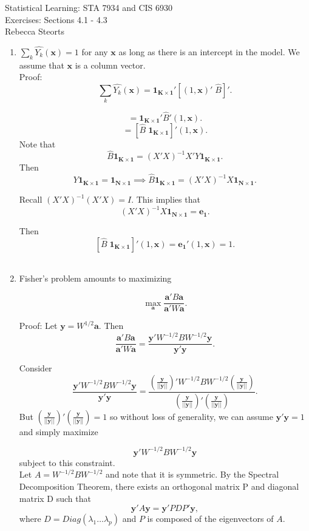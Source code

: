 \documentclass[12pt]{book}
\begin{document}
\newcommand{\ba} {\bm{a}}
\newcommand{\by} {\bm{y}}
\newcommand{\bx} {\bm{x}}
\newcommand{\bxn} {\bm{x_{new}}}
\newcommand{\bok} {\bm{1_{K\times 1}}}
\newcommand{\bon} {\bm{1_{N\times 1}}}
Statistical Learning: STA 7934 and CIS 6930\\
Exercises: Sections 4.1 - 4.3\\
Rebecca Steorts\\


\begin{enumerate}

\item $\sum_k \hat{Y_k}(\bx) = 1$ for any $\bx$ as long as there is an intercept in the model. We assume that $\bx$ is a column vector.\\

Proof: $$\sum_k \hat{Y_k}(\bx) =\bok' [(1,\bx)' \;\hat{B}]'.$$

$$ = \bok' \hat{B}' (1, \bx).$$
$$ = [\hat{B} \; \bok]' (1, \bx).$$
Note that $$\hat{B} \bok = (X'X)^{-1}X'Y\bok.$$
Then $$Y\bok = \bon \implies 
\hat{B} \bok = (X'X)^{-1}X \bon.$$

Recall $(X'X)^{-1}(X'X) = I.$ This implies that
$$ (X'X)^{-1}X \bon = \bm{e_1}.$$

Then $$ [\hat{B} \; \bok]' (1, \bx) = \bm{e_1}' (1, \bx) = 1.$$\\

\item Fisher's problem amounts to maximizing

$$ \max_{\ba}  \frac{\ba' B\ba }{\ba' W\ba }.$$



Proof: Let $\by = W^{1/2}\ba.$ Then
$$
\frac{\ba' B\ba }{\ba' W\ba } = 
\frac{\by' W^{-1/2}BW^{-1/2}\by}{\by' \by }.$$

Consider $$\frac{\by' W^{-1/2}BW^{-1/2}\by}{\by' \by } =
 \frac{\left(\frac{\by}{|| \by||}\right)'W^{-1/2}BW^{-1/2}\left(\frac{\by}{|| \by||}\right)}
{\left(\frac{\by}{|| \by||}\right)'\left(\frac{\by}{|| \by||}\right)}.$$ But $\left(\frac{\by}{|| \by||}\right)'\left(\frac{\by}{|| \by||}\right) = 1$ so without loss of generality, we can assume $\by'\by = 1$ and simply maximize 

$$\by' W^{-1/2}BW^{-1/2}\by$$ subject to this constraint.\\

Let $A = W^{-1/2}BW^{-1/2}$ and note that it is symmetric. By the Spectral Decomposition Theorem, there exists an orthogonal matrix P and diagonal matrix D such that
$$ \by' A \by = \by' PDP' \by,$$
where $D = Diag(\lambda_1 \ldots \lambda_p)$ and $P$ is composed of the eigenvectors of $A.$\\


\end{enumerate}
\end{document}
